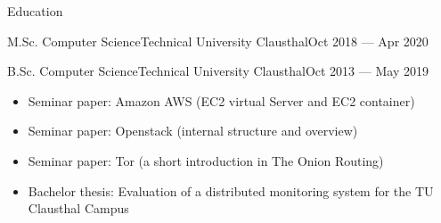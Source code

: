 \documentclass[]{mcdowellcv}
\begin{document}
\begin{cvsection}{Education}
\begin{cvsubsection}{M.Sc. Computer Science}{Technical University Clausthal}{Oct 2018 --- Apr 2020}

\end{cvsubsection}
\begin{cvsubsection}{B.Sc. Computer Science}{Technical University Clausthal}{Oct 2013 --- May 2019}
\begin{itemize}
	\item Seminar paper: Amazon AWS (EC2 virtual Server and EC2 container) 
	\item Seminar paper: Openstack (internal structure and overview) 
	\item Seminar paper: Tor (a short introduction in The Onion Routing) 
	\item Bachelor thesis: Evaluation of a distributed monitoring system for the TU Clausthal Campus 
\end{itemize}
\end{cvsubsection}

\end{cvsection}
\end{document}
